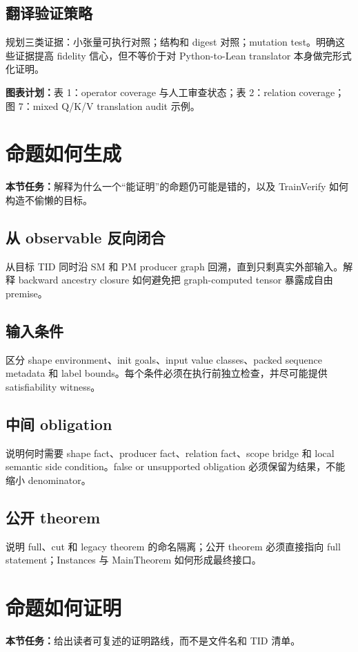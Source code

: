 \documentclass[11pt,a4paper]{ctexart}
\newcommand{\contract}[1]{\par\smallskip\noindent\colorbox{light}{\parbox{0.95\linewidth}{\textbf{本节任务：}#1}}\par\smallskip}
\newcommand{\figplan}[1]{\par\noindent\textbf{图表计划：}#1\par}
\begin{document}
\subsection{翻译验证策略}
规划三类证据：小张量可执行对照；结构和 digest 对照；mutation test。明确这些证据提高 fidelity 信心，但不等价于对 Python-to-Lean translator 本身做完形式化证明。

\figplan{表 1：operator coverage 与人工审查状态；表 2：relation coverage；图 7：mixed Q/K/V translation audit 示例。}

\section{命题如何生成}
\contract{解释为什么一个“能证明”的命题仍可能是错的，以及 TrainVerify 如何构造不偷懒的目标。}

\subsection{从 observable 反向闭合}
从目标 TID 同时沿 SM 和 PM producer graph 回溯，直到只剩真实外部输入。解释 backward ancestry closure 如何避免把 graph-computed tensor 暴露成自由 premise。

\subsection{输入条件}
区分 shape environment、init goals、input value classes、packed sequence metadata 和 label bounds。每个条件必须在执行前独立检查，并尽可能提供 satisfiability witness。

\subsection{中间 obligation}
说明何时需要 shape fact、producer fact、relation fact、scope bridge 和 local semantic side condition。false or unsupported obligation 必须保留为结果，不能缩小 denominator。

\subsection{公开 theorem}
说明 full、cut 和 legacy theorem 的命名隔离；公开 theorem 必须直接指向 full statement；Instances 与 MainTheorem 如何形成最终接口。

\section{命题如何证明}
\contract{给出读者可复述的证明路线，而不是文件名和 TID 清单。}
\end{document}
